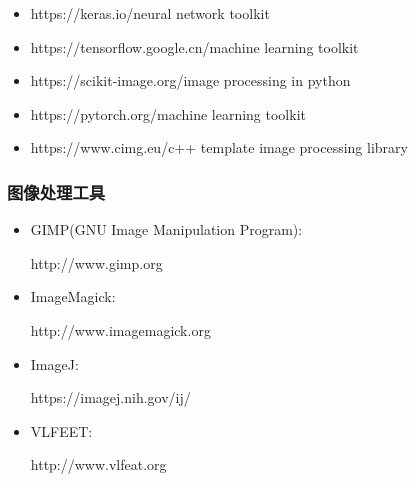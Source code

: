 \documentclass{beamer}
\newenvironment{itemizedot}{\begin{itemize} \renewcommand{\labelitemi}{$\bullet$}\renewcommand{\labelitemii}{$\bullet$}\renewcommand{\labelitemiii}{$\bullet$}\renewcommand{\labelitemiv}{$\bullet$}}{\end{itemize}}
\begin{document}
{{\begin{frame}
\begin{itemizedot}
    \item https://keras.io/{\hspace{3em}}neural network toolkit
    
    \item https://tensorflow.google.cn/\quad machine learning toolkit
    
    \item https://scikit-image.org/\qquad image processing in python
    
    \item https://pytorch.org/\qquad machine learning toolkit
    
    \item https://www.cimg.eu/\quad c++ template image processing library
  \end{itemizedot}
\end{frame}}{\begin{frame}
  \frametitle{图像处理工具}
  
  
  \begin{itemizedot}
    \item GIMP(GNU Image Manipulation Program):
    
    http://www.gimp.org
    
    \item ImageMagick:
    
    http://www.imagemagick.org
    
    \item ImageJ:
    
    https://imagej.nih.gov/ij/
    
    \item VLFEET:
    
    http://www.vlfeat.org
    
    \ 
  \end{itemizedot}
  
\end{frame}}}
\end{document}
